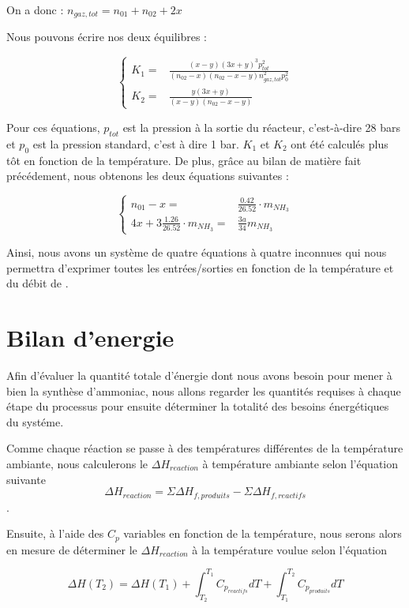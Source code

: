 On a donc : $n_{gaz,tot} = n_{01} + n_{02} + 2x$ 
  
Nous pouvons écrire nos deux équilibres : 
 
$$
	\left\{
		\begin{array}{rl}
			K_1 =& \frac{(x-y)(3x+y)^3p_{tot}^2}{(n_{02}-x)(n_{02}-x-y)n_{gaz,tot}^2p_0^2} \\
			K_2 =& \frac{y(3x+y)}{(x-y)(n_{02}-x-y)}
		\end{array}
	\right.
$$

Pour ces équations, $p_{tot}$ est la pression à la sortie du réacteur, c'est-à-dire 28 bars
et $p_0$ est la pression standard, c'est à dire 1 bar.
$K_1$ et $K_2$ ont été calculés plus tôt en fonction de la température. 
De plus, grâce au bilan de matière fait précédement, nous obtenons les deux équations suivantes :

$$
	\left\{
		\begin{array}{rl}
			n_{01} - x =& \frac{0.42}{26.52} \cdot m_{NH_3} \\
			4x + 3\frac{1.26}{26.52}\cdot m_{NH_3} =& \frac{3a}{34}m_{NH_3}
		\end{array}
	\right.
$$
 
Ainsi, nous avons un système de quatre équations à quatre inconnues qui nous permettra d'exprimer
toutes les entrées/sorties en fonction de la température et du débit de . 
   
\section{Bilan d'energie}
Afin d'évaluer la quantité totale d'énergie dont nous avons besoin pour mener à 
bien la synthèse d'ammoniac, nous allons regarder les quantités requises à chaque 
étape du processus pour ensuite déterminer la totalité des besoins énergétiques du
systéme.

Comme chaque réaction se passe à des températures différentes de la température ambiante,
nous calculerons le $\Delta H_{reaction}$ à température ambiante selon l'équation suivante 
$$\Delta H_{reaction} = \Sigma \Delta H_{f,produits} - \Sigma \Delta H_{f,reactifs}$$.

Ensuite, à l'aide des $C_{p}$ variables en fonction de la température, nous serons alors en 
mesure de déterminer le $\Delta H_{reaction}$ à la température voulue selon l'équation

$$\Delta H(T_2) = \Delta H(T_{1}) 
+ \int_{T_2}^{T_1} C_{p_{reactifs}} dT + \int_{T_1}^{T_2} C_{p_{produits}} dT$$ 

